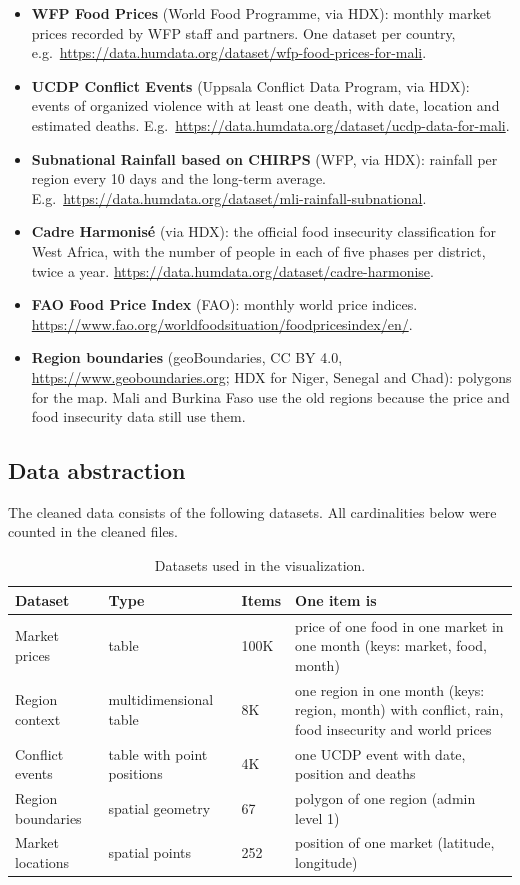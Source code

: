 \documentclass{article}
\begin{document}
\begin{itemize}
  \item \textbf{WFP Food Prices} (World Food Programme, via HDX): monthly market prices recorded by WFP staff and partners. One dataset per country, e.g.\ \url{https://data.humdata.org/dataset/wfp-food-prices-for-mali}.
  \item \textbf{UCDP Conflict Events} (Uppsala Conflict Data Program, via HDX): events of organized violence with at least one death, with date, location and estimated deaths. E.g.\ \url{https://data.humdata.org/dataset/ucdp-data-for-mali}.
  \item \textbf{Subnational Rainfall based on CHIRPS} (WFP, via HDX): rainfall per region every 10 days and the long-term average. E.g.\ \url{https://data.humdata.org/dataset/mli-rainfall-subnational}.
  \item \textbf{Cadre Harmonis\'e} (via HDX): the official food insecurity classification for West Africa, with the number of people in each of five phases per district, twice a year. \url{https://data.humdata.org/dataset/cadre-harmonise}.
  \item \textbf{FAO Food Price Index} (FAO): monthly world price indices. \url{https://www.fao.org/worldfoodsituation/foodpricesindex/en/}.
  \item \textbf{Region boundaries} (geoBoundaries, CC BY 4.0, \url{https://www.geoboundaries.org}; HDX for Niger, Senegal and Chad): polygons for the map. Mali and Burkina Faso use the old regions because the price and food insecurity data still use them.
\end{itemize}

\subsection{Data abstraction}

The cleaned data consists of the following datasets. All cardinalities below were counted in the cleaned files.

\begin{table}[H]
  \centering
  \small
  \begin{tabularx}{\linewidth}{l l l X}
    \hline
    \textbf{Dataset} & \textbf{Type} & \textbf{Items} & \textbf{One item is} \\
    \hline
    Market prices & table & 100K & price of one food in one market in one month (keys: market, food, month) \\
    Region context & multidimensional table & 8K & one region in one month (keys: region, month) with conflict, rain, food insecurity and world prices \\
    Conflict events & table with point positions & 4K & one UCDP event with date, position and deaths \\
    Region boundaries & spatial geometry & 67 & polygon of one region (admin level 1) \\
    Market locations & spatial points & 252 & position of one market (latitude, longitude) \\
    \hline
  \end{tabularx}
  \caption{Datasets used in the visualization.}
  \label{tab:datasets}
\end{table}
\end{document}
